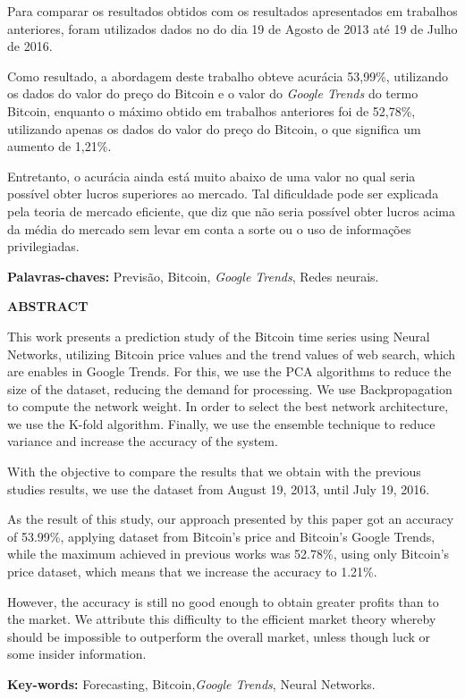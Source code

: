  Para comparar os resultados obtidos com os resultados apresentados  em trabalhos anteriores, foram utilizados dados no do dia 19 de Agosto de 2013 até 19 de Julho de 2016. 
 
 Como resultado, a abordagem deste trabalho obteve acurácia 53,99\%, utilizando os dados do valor do preço do Bitcoin e o valor do \textit{Google Trends} do termo Bitcoin, enquanto o máximo obtido em trabalhos anteriores foi de 52,78\%, utilizando apenas os dados do valor do preço do Bitcoin, o que significa um aumento de 1,21\%.
 
 Entretanto, o acurácia ainda está muito abaixo de uma valor no qual seria possível obter lucros superiores ao mercado. Tal dificuldade pode ser explicada pela teoria de mercado eficiente, que diz que não seria possível obter lucros acima da média do mercado sem levar em conta a sorte ou o uso de informações privilegiadas.


\begin{flushleft}
{\bf Palavras-chaves:} Previsão, Bitcoin, \textit{Google Trends}, Redes neurais.
\end{flushleft}

\newpage

\begin{center}
\textbf{\large ABSTRACT}
\end{center}
\vspace{0.5cm}

This work presents a prediction study of the Bitcoin time series using Neural Networks, utilizing Bitcoin price values and the trend values of web search, which are enables in Google Trends. For this, we use the  PCA algorithms to reduce the size of the dataset, reducing the demand for processing. We use Backpropagation to compute the network weight. In order to select the best network architecture, we use the K-fold algorithm.  Finally, we use the ensemble technique to reduce variance and increase the accuracy of the system.

 With the objective to compare the results that we obtain with the previous studies results, we use the dataset from August 19, 2013, until July 19, 2016.
 
 As the result of this study, our approach presented by this paper got an accuracy of 53.99\%, applying dataset from Bitcoin's price and  Bitcoin's Google Trends, while the maximum achieved in previous works was 52.78\%, using only Bitcoin's price dataset, which means that we increase the accuracy to 1.21\%.
 
 However, the accuracy is still no good enough to obtain greater profits than to the market. We attribute this difficulty to the efficient market theory whereby should be impossible to outperform the overall market, unless though luck or some insider information.


\begin{flushleft}
{\bf Key-words:} Forecasting, Bitcoin,\textit{Google Trends}, Neural Networks.
\end{flushleft}
